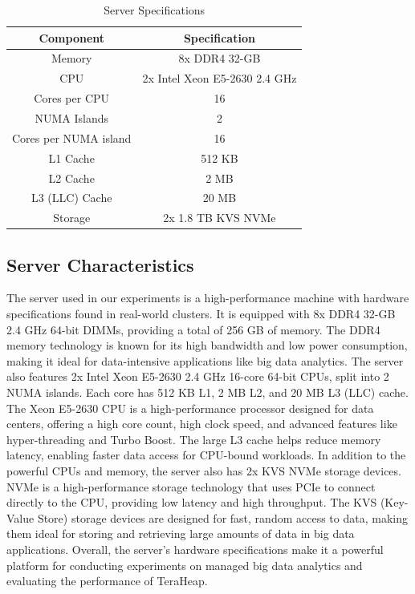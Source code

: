 \begin{table}[t!]
  \centering
  \caption{Server Specifications}
  \label{tab:server-specs}
  \begin{tabular}{|c|c|}
    \hline
    \textbf{Component} & \textbf{Specification} \\
    \hline
    Memory & 8x DDR4 32-GB \\
    CPU & 2x Intel Xeon E5-2630 2.4 GHz \\
    Cores per CPU & 16 \\
    NUMA Islands & 2 \\
    Cores per NUMA island & 16 \\
    L1 Cache & 512 KB \\
    L2 Cache & 2 MB \\
    L3 (LLC) Cache & 20 MB \\
    Storage & 2x 1.8 TB KVS NVMe \\
    \hline
  \end{tabular}
\end{table}

\subsection{Server Characteristics}
The server used in our experiments is a high-performance machine with
hardware specifications found in real-world clusters.
It is equipped with 8x DDR4 32-GB 2.4 GHz 64-bit DIMMs, providing a
total of 256 GB of memory. The DDR4 memory technology is known for its
high bandwidth and low power consumption, making it ideal for
data-intensive applications like big data analytics. The server also
features 2x Intel Xeon E5-2630 2.4 GHz 16-core 64-bit CPUs, split into 2
NUMA islands. Each core has 512 KB L1, 2 MB L2, and 20 MB L3 (LLC) cache.
The Xeon E5-2630 CPU is a high-performance processor designed for data
centers, offering a high core count, high clock speed, and advanced
features like hyper-threading and Turbo Boost. The large L3 cache
helps reduce memory latency, enabling faster data access for CPU-bound
workloads. In addition to the powerful CPUs and memory, the server
also has 2x KVS NVMe storage devices. NVMe is a high-performance
storage technology that uses PCIe to connect directly to the CPU,
providing low latency and high throughput. The KVS (Key-Value Store)
storage devices are designed for fast, random access to data, making
them ideal for storing and retrieving large amounts of data in big
data applications. Overall, the server's hardware specifications make
it a powerful platform for conducting experiments on managed big data
analytics and evaluating the performance of TeraHeap. 

